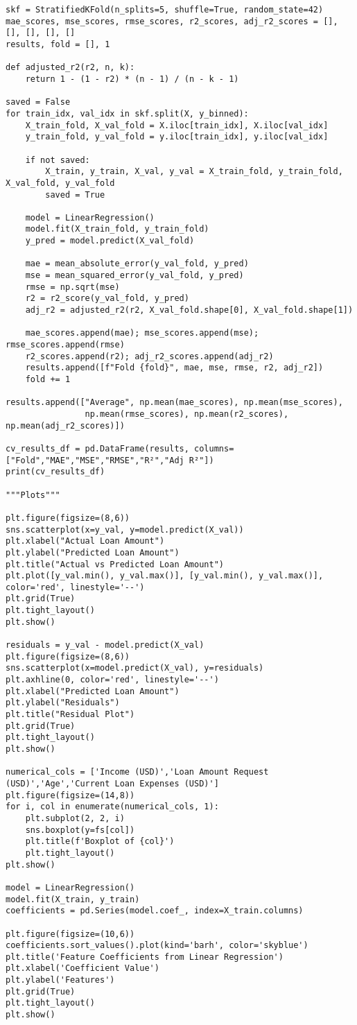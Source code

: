 \documentclass[11pt]{article}
\begin{document}
\begin{lstlisting}[style=python]
skf = StratifiedKFold(n_splits=5, shuffle=True, random_state=42)
mae_scores, mse_scores, rmse_scores, r2_scores, adj_r2_scores = [], [], [], [], []
results, fold = [], 1

def adjusted_r2(r2, n, k):
    return 1 - (1 - r2) * (n - 1) / (n - k - 1)

saved = False
for train_idx, val_idx in skf.split(X, y_binned):
    X_train_fold, X_val_fold = X.iloc[train_idx], X.iloc[val_idx]
    y_train_fold, y_val_fold = y.iloc[train_idx], y.iloc[val_idx]

    if not saved:
        X_train, y_train, X_val, y_val = X_train_fold, y_train_fold, X_val_fold, y_val_fold
        saved = True

    model = LinearRegression()
    model.fit(X_train_fold, y_train_fold)
    y_pred = model.predict(X_val_fold)

    mae = mean_absolute_error(y_val_fold, y_pred)
    mse = mean_squared_error(y_val_fold, y_pred)
    rmse = np.sqrt(mse)
    r2 = r2_score(y_val_fold, y_pred)
    adj_r2 = adjusted_r2(r2, X_val_fold.shape[0], X_val_fold.shape[1])

    mae_scores.append(mae); mse_scores.append(mse); rmse_scores.append(rmse)
    r2_scores.append(r2); adj_r2_scores.append(adj_r2)
    results.append([f"Fold {fold}", mae, mse, rmse, r2, adj_r2])
    fold += 1

results.append(["Average", np.mean(mae_scores), np.mean(mse_scores),
                np.mean(rmse_scores), np.mean(r2_scores), np.mean(adj_r2_scores)])

cv_results_df = pd.DataFrame(results, columns=["Fold","MAE","MSE","RMSE","R²","Adj R²"])
print(cv_results_df)

"""Plots"""

plt.figure(figsize=(8,6))
sns.scatterplot(x=y_val, y=model.predict(X_val))
plt.xlabel("Actual Loan Amount")
plt.ylabel("Predicted Loan Amount")
plt.title("Actual vs Predicted Loan Amount")
plt.plot([y_val.min(), y_val.max()], [y_val.min(), y_val.max()], color='red', linestyle='--')
plt.grid(True)
plt.tight_layout()
plt.show()

residuals = y_val - model.predict(X_val)
plt.figure(figsize=(8,6))
sns.scatterplot(x=model.predict(X_val), y=residuals)
plt.axhline(0, color='red', linestyle='--')
plt.xlabel("Predicted Loan Amount")
plt.ylabel("Residuals")
plt.title("Residual Plot")
plt.grid(True)
plt.tight_layout()
plt.show()

numerical_cols = ['Income (USD)','Loan Amount Request (USD)','Age','Current Loan Expenses (USD)']
plt.figure(figsize=(14,8))
for i, col in enumerate(numerical_cols, 1):
    plt.subplot(2, 2, i)
    sns.boxplot(y=fs[col])
    plt.title(f'Boxplot of {col}')
    plt.tight_layout()
plt.show()

model = LinearRegression()
model.fit(X_train, y_train)
coefficients = pd.Series(model.coef_, index=X_train.columns)

plt.figure(figsize=(10,6))
coefficients.sort_values().plot(kind='barh', color='skyblue')
plt.title('Feature Coefficients from Linear Regression')
plt.xlabel('Coefficient Value')
plt.ylabel('Features')
plt.grid(True)
plt.tight_layout()
plt.show()
\end{lstlisting}
\end{document}
